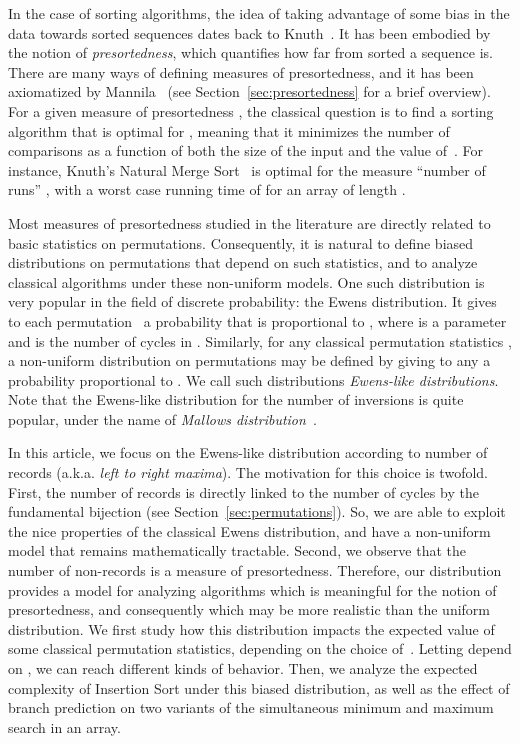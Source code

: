 \documentclass[proceedings]{aofa}
\begin{document}
In the case of sorting algorithms, the idea of taking advantage of some bias in the data towards sorted sequences dates back to Knuth~\cite[p. 336]{Knuth98}. 
It has been embodied by the notion of \emph{presortedness}, which quantifies how far from sorted a sequence is. 
There are many ways of defining measures of presortedness, and it has been axiomatized by Mannila~\cite{Mannila1985} (see Section~\ref{sec:presortedness} for a brief overview). 
For a given measure of presortedness , the classical question is to find a sorting algorithm that is optimal for , meaning that it minimizes the number of comparisons as a function of both the size of the input and the value of~. 
For instance, Knuth's Natural Merge Sort~\cite{Knuth98} is optimal for the measure ``number of runs'' , with a worst case running time of  for an array of length . 

Most measures of presortedness studied in the literature are directly related to basic statistics on permutations. 
Consequently, it is natural to define biased distributions on permutations that depend on such statistics, 
and to analyze classical algorithms under these non-uniform models. 
One such distribution is very popular in the field of discrete probability: the Ewens distribution. 
It gives to each permutation~ a probability that is proportional to ,
where  is a parameter and  is the number of cycles in . 
Similarly, for any classical permutation statistics , 
a non-uniform distribution on permutations may be defined by giving to any  a probability proportional to . 
We call such distributions \emph{Ewens-like distributions}. 
Note that the Ewens-like distribution for the number of inversions is quite popular, under the name of \emph{Mallows distribution}~\cite[and references therein]{Gladkich}. 
 


In this article, we focus on the Ewens-like distribution according to  number of records (a.k.a. \emph{left to right maxima}). 
The motivation for this choice is twofold. 
First, the number of records is directly linked to the number of cycles by the fundamental bijection (see Section~\ref{sec:permutations}). 
So, we are able to exploit the nice properties of the classical Ewens distribution, and have a non-uniform model that remains mathematically tractable. 
Second, we observe that the number of non-records is a measure of presortedness. 
Therefore, our distribution provides a model for analyzing algorithms which is meaningful for the notion of presortedness, 
and consequently which may be more realistic than the uniform distribution. 
We first study how this distribution impacts the expected value of some classical permutation statistics, depending on the choice of~. 
Letting  depend on , we can reach different kinds of behavior. 
Then, we analyze the expected complexity of Insertion Sort under this biased distribution, 
as well as the effect of branch prediction on two variants of the simultaneous minimum and maximum search in an array.
\end{document}
